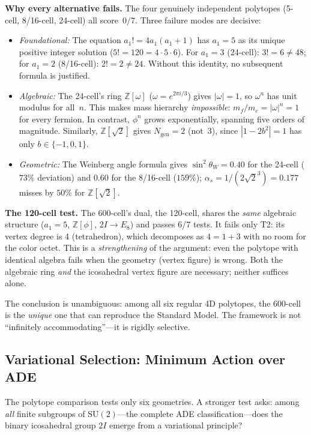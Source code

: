 \documentclass[12pt,a4paper]{article}
\theoremstyle{definition}
\begin{document}
\textbf{Why every alternative fails.}  The four genuinely independent polytopes (5-cell, 8/16-cell, 24-cell) all score~$0/7$.  Three failure modes are decisive:
\begin{itemize}
\item \emph{Foundational:} The equation $a_1! = 4a_1(a_1+1)$ has $a_1 = 5$ as its unique positive integer solution ($5! = 120 = 4 \cdot 5 \cdot 6$).  For $a_1 = 3$ (24-cell): $3! = 6 \neq 48$; for $a_1 = 2$ (8/16-cell): $2! = 2 \neq 24$.  Without this identity, no subsequent formula is justified.
\item \emph{Algebraic:} The 24-cell's ring $\mathbb{Z}[\omega]$ ($\omega = e^{2\pi i/3}$) gives $|\omega| = 1$, so $\omega^n$ has unit modulus for all~$n$.  This makes mass hierarchy \emph{impossible}: $m_f/m_e = |\omega|^n = 1$ for every fermion.  In contrast, $\phi^n$ grows exponentially, spanning five orders of magnitude.  Similarly, $\mathbb{Z}[\sqrt{2}]$ gives $N_{\text{gen}} = 2$ (not~3), since $|1 - 2b^2| = 1$ has only $b \in \{-1, 0, 1\}$.
\item \emph{Geometric:} The Weinberg angle formula gives $\sin^2\theta_W = 0.40$ for the 24-cell ($73\%$ deviation) and $0.60$ for the 8/16-cell ($159\%$); $\alpha_s = 1/(2\sqrt{2}^3) = 0.177$ misses by $50\%$ for $\mathbb{Z}[\sqrt{2}]$.
\end{itemize}

\textbf{The 120-cell test.}  The 600-cell's dual, the 120-cell, shares the \emph{same} algebraic structure ($a_1 = 5$, $\mathbb{Z}[\phi]$, $2I \to E_8$) and passes 6/7 tests.  It fails only T2: its vertex degree is 4 (tetrahedron), which decomposes as $4 = 1 + 3$ with no room for the color octet.  This is a \emph{strengthening} of the argument: even the polytope with identical algebra fails when the geometry (vertex figure) is wrong.  Both the algebraic ring \emph{and} the icosahedral vertex figure are necessary; neither suffices alone.

The conclusion is unambiguous: among all six regular 4D polytopes, the 600-cell is the \emph{unique} one that can reproduce the Standard Model.  The framework is not ``infinitely accommodating''---it is rigidly selective.

\subsection{Variational Selection: Minimum Action over ADE}

The polytope comparison tests only six geometries.  A stronger test asks: among \emph{all} finite subgroups of $\mathrm{SU}(2)$---the complete ADE classification---does the binary icosahedral group $2I$ emerge from a variational principle?
\end{document}

